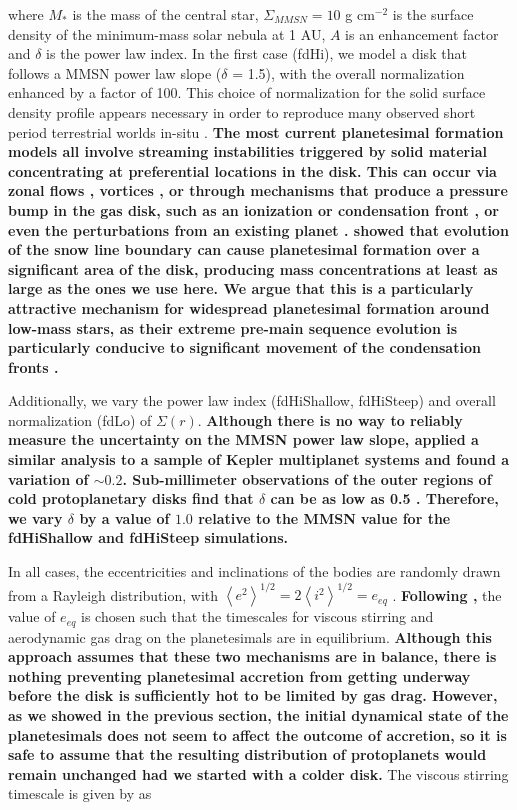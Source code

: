 \documentclass[twocolumn,linenumbers]{aastex63}
\begin{document}
where $M_{*}$ is the mass of the central star, $\Sigma_{MMSN} = 10$ g
cm$^{-2}$ is the surface density of the minimum-mass solar nebula
\citep{hayashi81} at 1 AU, $A$ is an enhancement factor and $\delta$ is the power law index.
In the first case (fdHi), we model a disk that follows a MMSN power law slope ($\delta$ = 1.5), with the overall normalization enhanced by a factor of 100. This choice of normalization for the solid surface density profile appears necessary in order to reproduce many observed short period terrestrial worlds in-situ \citep{hansen12}. \textbf{The most current planetesimal formation models all involve streaming instabilities triggered by solid material concentrating at preferential locations in the disk. This can occur via zonal flows \citep{johansen2009b, simon12}, vortices \citep{klahr03}, or through mechanisms that produce a pressure bump in the gas disk, such as an ionization \citep{lyra08} or condensation front \citep{brauer08b, drkazowska13}, or even the perturbations from an existing planet \citep{shibaike20}. \citet{drkazowska18} showed that evolution of the snow line boundary can cause planetesimal formation over a significant area of the disk, producing mass concentrations at least as large as the ones we use here. We argue that this is a particularly attractive mechanism for widespread planetesimal formation around low-mass stars, as their extreme pre-main sequence evolution is particularly conducive to significant movement of the condensation fronts \citep{baraffe15}.} 

Additionally, we vary the power law index (fdHiShallow, fdHiSteep) and overall normalization (fdLo) of $\Sigma(r)$. \textbf{Although there is no way to reliably measure the uncertainty on the MMSN power law slope, \citet{chiang13} applied a similar analysis to a sample of Kepler multiplanet systems and found a variation of $\sim 0.2$. Sub-millimeter observations of the outer regions of cold protoplanetary disks find that $\delta$ can be as low as 0.5 \citep{mundy00, andrews09, andrews10}. Therefore, we vary $\delta$ by a value of $1.0$ relative to the MMSN value for the fdHiShallow and fdHiSteep simulations.}

In all cases, the eccentricities and inclinations of the bodies are randomly drawn from a Rayleigh distribution, with $\left< e^{2} \right>^{1/2} = 2\left<i^{2} \right>^{1/2} = e_{eq}$ \citep{ida93}. \textbf{Following \citet{kokubo98},} the value of $e_{eq}$ is chosen such that the timescales for viscous stirring and aerodynamic gas drag on the planetesimals are in equilibrium. \textbf{Although this approach assumes that these two mechanisms are in balance, there is nothing preventing planetesimal accretion from getting underway before the disk is sufficiently hot to be limited by gas drag. However, as we showed in the previous section, the initial dynamical state of the planetesimals does not seem to affect the outcome of accretion, so it is safe to assume that the resulting distribution of protoplanets would remain unchanged had we started with a colder disk.} The viscous stirring timescale is given by \citet{ida93} as
\end{document}
